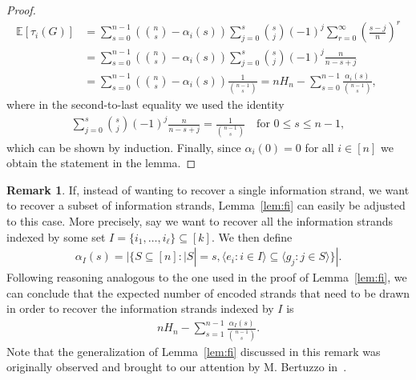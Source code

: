 \documentclass[11pt,a4paper,reqno,twoside]{amsart}
\theoremstyle{definition}
\newtheorem{remark}{Remark}
\newcommand{\E}{\mathbb{E}}
\begin{document}
\begin{proof}
\begin{align*}
    \E[\tau_i(G)]&= \sum_{s=0}^{n-1}\left(\binom{n}{s}-{\alpha_i(s)}\right) \displaystyle\sum_{j=0}^{s}\binom{s}{j}(-1)^j\sum_{r=0}^\infty\left(\frac{s-j}{n}\right)^{r} \\
    &= \sum_{s=0}^{n-1}\left(\binom{n}{s}-{\alpha_i(s)}\right) \displaystyle\sum_{j=0}^{s}\binom{s}{j}(-1)^j\frac{n}{n-s+j} \\ 
    &= \sum_{s=0}^{n-1}\left(\binom{n}{s}-{\alpha_i(s)}\right) \displaystyle \frac{1}{\binom{n-1}{s}} = n  H_n - \sum_{s=0}^{n-1} \displaystyle \frac{\alpha_i(s)}{\binom{n-1}{s}},
\end{align*}
where in the second-to-last equality we used the identity
\begin{align} \label{eq:dani}
    \sum_{j=0}^{s}\binom{s}{j}(-1)^j\frac{n}{n-s+j} = \frac{1}{\binom{n-1}{s}} \quad \mbox{for $0 \le s\le n-1$},
\end{align}
which can be shown by induction. Finally, since $\alpha_i(0)=0$ for all $i \in [n]$ we obtain the statement in the lemma.
\end{proof}

\begin{remark}
If, instead of wanting to recover a single information strand, we want to recover a subset of information strands, Lemma~\ref{lem:fi} can easily be adjusted to this case. More precisely, say we want to recover all the information strands indexed by some set $I = \{i_1, \dots, i_{\ell}\} \subseteq [k]$. We then define  
\begin{align*}
    \alpha_I(s)=|\{S \subseteq [n] : |S| = s, \langle e_i : i \in I\rangle \subseteq \langle g_j : j \in S\rangle \}|.
\end{align*}
Following reasoning analogous to the one used in the proof of Lemma~\ref{lem:fi}, we can conclude that the expected number of encoded strands that need to be drawn in order to recover the information strands indexed by $I$ is
\begin{align*}
   nH_n-\sum_{s=1}^{n-1} \frac{\alpha_I(s)}{\binom{n-1}{s}}. 
\end{align*}
Note that the generalization of Lemma~\ref{lem:fi} discussed in this remark was originally observed and brought to our attention by M. Bertuzzo in~\cite{matteo}.
\end{remark}
\end{document}
